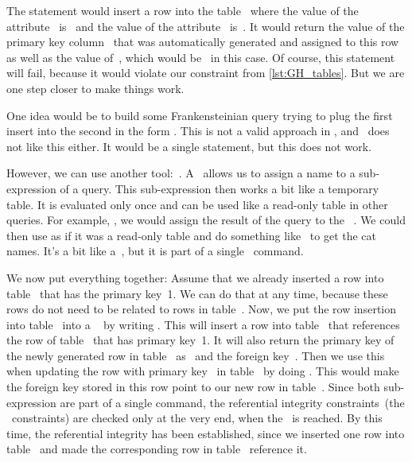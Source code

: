 The statement  would insert a row into the table~ where the value of the attribute~ is~ and the value of the attribute~ is~.
It would return the value of the primary key column~ that was automatically generated and assigned to this row as well as the value of~, which would be~ in this case.
Of course, this statement will fail, because it would violate our constraint  from \cref{lst:GH_tables}.
But we are one step closer to make things work.%
%
\begin{sloppypar}%
One idea would be to build some Frankensteinian query trying to plug the first insert into the second in the
 form \linebreak[3].
This is not a valid approach in \sql, and \postgresql\ does not like this either.
It would be a single statement, but this does not work.%
\end{sloppypar}%
%
However, we can use another tool:~.
A~ allows us to assign a name to a sub-expression of a query.
This sub-expression then works a bit like a temporary table.
It is evaluated only once and can be used like a read-only table in other queries.
For example, , we would assign the result of the query  to the ~.
We could then use  as if it was a read-only table and do something like~ to get the cat names.
It's a bit like a~, but it is part of a single \sql\ command.

We now put everything together:
Assume that we already inserted a row into table~ that has the primary key~1.
We can do that at any time, because these rows do not need to be related to rows in table~.
Now, we put the row insertion into table~ into a ~ by writing .
This  will insert a row into table~ that references the row of table~ that has primary key~1.
It will also return the primary key of the newly generated row in table~ as~ and the foreign key~.
Then we use this  when updating the row with primary key~ in table~ by doing .
This would make the foreign key stored in this row point to our new row in table~.
Since both sub-expression are part of a single command, the referential integrity constraints~(the ~constraints) are checked only at the very end, when  the~\sqlil{;} is reached.
By this time, the referential integrity has been established, since we inserted one row into table~ and made the corresponding row in table~ reference it.

